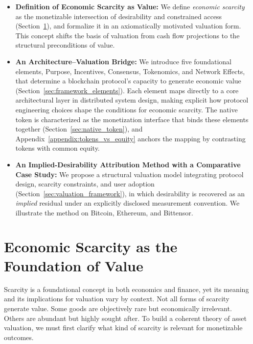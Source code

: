 \documentclass[12pt]{article}
\begin{document}
\begin{itemize}
    \item \textbf{Definition of Economic Scarcity as Value:} We define \emph{economic scarcity} as the monetizable intersection of desirability and constrained access (Section~\ref{sec:scarcity_def}), and formalize it in an axiomatically motivated valuation form. This concept shifts the basis of valuation from cash flow projections to the structural preconditions of value.

    \item \textbf{An Architecture--Valuation Bridge:} We introduce five foundational elements, Purpose, Incentives, Consensus, Tokenomics, and Network Effects, that determine a blockchain protocol's capacity to generate economic value (Section~\ref{sec:framework_elements}). Each element maps directly to a core architectural layer in distributed system design, making explicit how protocol engineering choices shape the conditions for economic scarcity. The native token is characterized as the monetization interface that binds these elements together (Section~\ref{sec:native_token}), and Appendix~\ref{appendix:tokens_vs_equity} anchors the mapping by contrasting tokens with common equity.

    \item \textbf{An Implied-Desirability Attribution Method with a Comparative Case Study:} We propose a structural valuation model integrating protocol design, scarcity constraints, and user adoption (Section~\ref{sec:valuation_framework}), in which desirability is recovered as an \emph{implied} residual under an explicitly disclosed measurement convention. We illustrate the method on Bitcoin, Ethereum, and Bittensor.
\end{itemize}

\section{Economic Scarcity as the Foundation of Value}
\label{sec:scarcity_def}

Scarcity is a foundational concept in both economics and finance, yet its meaning and its implications for valuation vary by context. Not all forms of scarcity generate value. Some goods are objectively rare but economically irrelevant. Others are abundant but highly sought after. To build a coherent theory of asset valuation, we must first clarify what kind of scarcity is relevant for monetizable outcomes.
\end{document}

